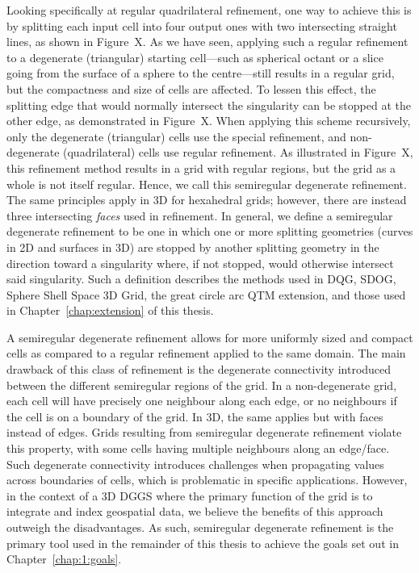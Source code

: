 Looking specifically at regular quadrilateral refinement, one way to achieve this is by splitting each input cell into four output ones with two intersecting straight lines, as shown in Figure~X.
As we have seen, applying such a regular refinement to a degenerate (triangular) starting cell---such as spherical octant or a slice going from the surface of a sphere to the centre---still results in a regular grid, but the compactness and size of cells are affected.
To lessen this effect, the splitting edge that would normally intersect the singularity can be stopped at the other edge, as demonstrated in Figure~X.
When applying this scheme recursively, only the degenerate (triangular) cells use the special refinement, and non-degenerate (quadrilateral) cells use regular refinement.
As illustrated in Figure~X, this refinement method results in a grid with regular regions, but the grid as a whole is not itself regular.
Hence, we call this semiregular degenerate refinement.
The same principles apply in 3D for hexahedral grids; however, there are instead three intersecting \textit{faces} used in refinement.
In general, we define a semiregular degenerate refinement to be one in which one or more splitting geometries (curves in 2D and surfaces in 3D) are stopped by another splitting geometry in the direction toward a singularity where, if not stopped, would otherwise intersect said singularity.
Such a definition describes the methods used in DQG, SDOG, Sphere Shell Space 3D Grid, the great circle arc QTM extension, and those used in Chapter~\ref{chap:extension} of this thesis.


A semiregular degenerate refinement allows for more uniformly sized and compact cells as compared to a regular refinement applied to the same domain.
The main drawback of this class of refinement is the degenerate connectivity introduced between the different semiregular regions of the grid.
In a non-degenerate grid, each cell will have precisely one neighbour along each edge, or no neighbours if the cell is on a boundary of the grid.
In 3D, the same applies but with faces instead of edges.
Grids resulting from semiregular degenerate refinement violate this property, with some cells having multiple neighbours along an edge/face.
Such degenerate connectivity introduces challenges when propagating values across boundaries of cells, which is problematic in specific applications.
However, in the context of a 3D DGGS where the primary function of the grid is to integrate and index geospatial data, we believe the benefits of this approach outweigh the disadvantages.
As such, semiregular degenerate refinement is the primary tool used in the remainder of this thesis to achieve the goals set out in Chapter~\ref{chap:1:goals}.
